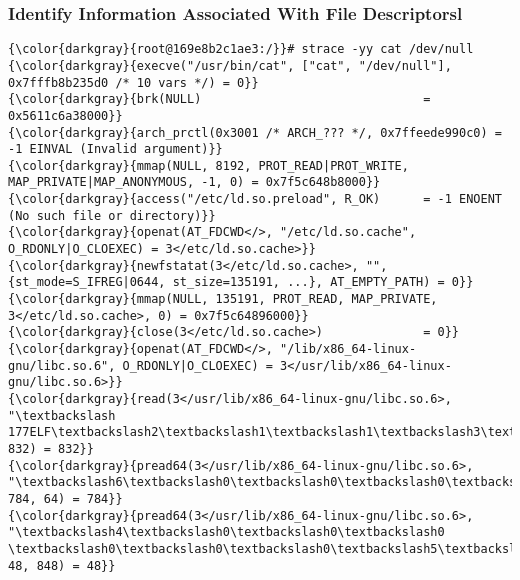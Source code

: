 		\subsubsection{Identify Information Associated With File Descriptorsl}
{\footnotesize{
\begin{Verbatim}[commandchars=\\\{\}]
{\color{darkgray}{root@169e8b2c1ae3:/}}# strace -yy cat /dev/null
{\color{darkgray}{execve("/usr/bin/cat", ["cat", "/dev/null"], 0x7fffb8b235d0 /* 10 vars */) = 0}}
{\color{darkgray}{brk(NULL)                               = 0x5611c6a38000}}
{\color{darkgray}{arch_prctl(0x3001 /* ARCH_??? */, 0x7ffeede990c0) = -1 EINVAL (Invalid argument)}}
{\color{darkgray}{mmap(NULL, 8192, PROT_READ|PROT_WRITE, MAP_PRIVATE|MAP_ANONYMOUS, -1, 0) = 0x7f5c648b8000}}
{\color{darkgray}{access("/etc/ld.so.preload", R_OK)      = -1 ENOENT (No such file or directory)}}
{\color{darkgray}{openat(AT_FDCWD</>, "/etc/ld.so.cache", O_RDONLY|O_CLOEXEC) = 3</etc/ld.so.cache>}}
{\color{darkgray}{newfstatat(3</etc/ld.so.cache>, "", {st_mode=S_IFREG|0644, st_size=135191, ...}, AT_EMPTY_PATH) = 0}}
{\color{darkgray}{mmap(NULL, 135191, PROT_READ, MAP_PRIVATE, 3</etc/ld.so.cache>, 0) = 0x7f5c64896000}}
{\color{darkgray}{close(3</etc/ld.so.cache>)              = 0}}
{\color{darkgray}{openat(AT_FDCWD</>, "/lib/x86_64-linux-gnu/libc.so.6", O_RDONLY|O_CLOEXEC) = 3</usr/lib/x86_64-linux-gnu/libc.so.6>}}
{\color{darkgray}{read(3</usr/lib/x86_64-linux-gnu/libc.so.6>, "\textbackslash 177ELF\textbackslash2\textbackslash1\textbackslash1\textbackslash3\textbackslash0\textbackslash0\textbackslash0\textbackslash0\textbackslash0\textbackslash0\textbackslash0\textbackslash0\textbackslash3\textbackslash0>\textbackslash0\textbackslash1\textbackslash0\textbackslash0\textbackslash0P\textbackslash237\textbackslash2\textbackslash0\textbackslash0\textbackslash0\textbackslash0\textbackslash0"..., 832) = 832}}
{\color{darkgray}{pread64(3</usr/lib/x86_64-linux-gnu/libc.so.6>, "\textbackslash6\textbackslash0\textbackslash0\textbackslash0\textbackslash4\textbackslash0\textbackslash0\textbackslash0@\textbackslash0\textbackslash0\textbackslash0\textbackslash0\textbackslash0\textbackslash0\textbackslash0@\textbackslash0\textbackslash0\textbackslash0\textbackslash0\textbackslash0\textbackslash0\textbackslash0@\textbackslash0\textbackslash0\textbackslash0\textbackslash0\textbackslash0\textbackslash0\textbackslash0"..., 784, 64) = 784}}
{\color{darkgray}{pread64(3</usr/lib/x86_64-linux-gnu/libc.so.6>, "\textbackslash4\textbackslash0\textbackslash0\textbackslash0 \textbackslash0\textbackslash0\textbackslash0\textbackslash5\textbackslash0\textbackslash0\textbackslash0GNU\textbackslash0\textbackslash2\textbackslash0\textbackslash0\textbackslash300\textbackslash4\textbackslash0\textbackslash0\textbackslash0\textbackslash3\textbackslash0\textbackslash0\textbackslash0\textbackslash0\textbackslash0\textbackslash0\textbackslash0"..., 48, 848) = 48}}

\end{Verbatim}}}
